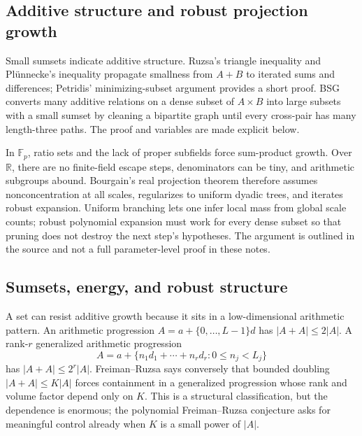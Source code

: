 \subsection{Additive structure and robust projection growth}\label{04-visual-computing-ii-ch033-additive-structure-and-robust-projection-growth}

\hypertarget{04-visual-computing-ii-ch033-additive-structure-and-robust-projection-growth}{}

Small sumsets indicate additive structure. Ruzsa's triangle inequality and Plünnecke's inequality propagate smallness from \(A+B\) to iterated sums and differences; Petridis' minimizing-subset argument provides a short proof. BSG converts many additive relations on a dense subset of \(A\times B\) into large subsets with a small sumset by cleaning a bipartite graph until every cross-pair has many length-three paths. The proof and variables are made explicit below.

In \(\mathbb F_p\), ratio sets and the lack of proper subfields force sum-product growth. Over \(\mathbb R\), there are no finite-field escape steps, denominators can be tiny, and arithmetic subgroups abound. Bourgain's real projection theorem therefore assumes nonconcentration at all scales, regularizes to uniform dyadic trees, and iterates robust expansion. Uniform branching lets one infer local mass from global scale counts; robust polynomial expansion must work for every dense subset so that pruning does not destroy the next step's hypotheses. The argument is outlined in the source and not a full parameter-level proof in these notes.

\subsection{Sumsets, energy, and robust structure}\label{04-visual-computing-ii-ch033-sumsets-energy-and-robust-structure}

\hypertarget{04-visual-computing-ii-ch033-sumsets-energy-and-robust-structure}{}

A set can resist additive growth because it sits in a low-dimensional arithmetic pattern. An arithmetic progression \(A=a+\{0,\ldots,L-1\}d\) has \(|A+A|\le 2|A|\). A rank-\(r\) generalized arithmetic progression \[
A=a+\{n_1d_1+\cdots+n_rd_r:0\le n_j<L_j\}
\] has \(|A+A|\le 2^r|A|\). Freiman--Ruzsa says conversely that bounded doubling \(|A+A|\le K|A|\) forces containment in a generalized progression whose rank and volume factor depend only on \(K\). This is a structural classification, but the dependence is enormous; the polynomial Freiman--Ruzsa conjecture asks for meaningful control already when \(K\) is a small power of \(|A|\).

